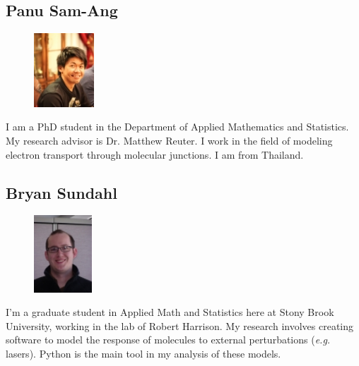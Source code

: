 \documentclass[]{article}
\begin{document}
\subsection*{Panu Sam-Ang} 
\begin{figure}
\begin{centering}
    \includegraphics[width=0.2\textwidth]{panu.jpg}
\end{centering}
\end{figure}
I am a PhD student in the Department of Applied Mathematics and Statistics. My research advisor is Dr. Matthew Reuter. I work in the field of modeling electron transport through molecular junctions. I am from Thailand.
\vspace{0.5 in}

\subsection*{Bryan Sundahl} 
\begin{figure}
\begin{centering}
    \includegraphics[width=0.193\textwidth]{bryan.jpg}
\end{centering}
\end{figure}
I'm a graduate student in Applied Math and Statistics here at Stony Brook University, working in the lab of Robert Harrison. My research involves creating software to model the response of molecules to external perturbations (\textit{e.g.} lasers).  Python is the main tool in my analysis of these models. 
\end{document}

